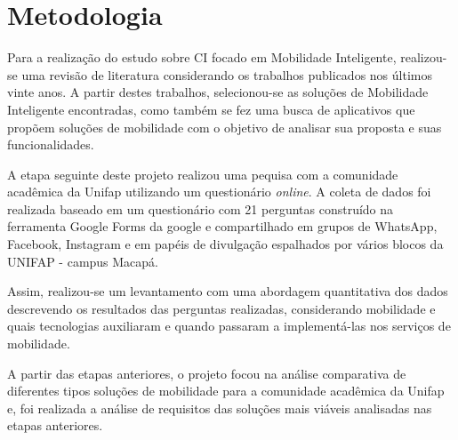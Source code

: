 %
%

\chapter{Metodologia}\label{chap:Metodologia} 



Para a realização do estudo sobre CI focado em Mobilidade Inteligente, realizou-se uma revisão de literatura considerando os trabalhos publicados nos últimos vinte anos. A partir destes trabalhos, selecionou-se as soluções de Mobilidade Inteligente encontradas, como também se fez uma busca de aplicativos que propõem soluções de mobilidade com o objetivo de analisar sua proposta e suas funcionalidades. 

A etapa seguinte deste projeto realizou uma pequisa com a comunidade acadêmica da Unifap utilizando um questionário \textit{online}.
A coleta de dados foi realizada baseado em um questionário com 21 perguntas construído na ferramenta Google Forms da google e compartilhado em grupos de WhatsApp, Facebook, Instagram e em papéis de divulgação espalhados por vários blocos da UNIFAP - campus Macapá. %

Assim, realizou-se um levantamento com uma abordagem quantitativa dos dados descrevendo os resultados das perguntas realizadas, considerando mobilidade e quais tecnologias auxiliaram e quando passaram a implementá-las nos serviços de mobilidade. 

A partir das etapas anteriores, o projeto focou na análise comparativa de diferentes tipos soluções de mobilidade para a comunidade acadêmica da Unifap e, foi realizada a análise de requisitos das soluções mais viáveis analisadas nas etapas anteriores. 


